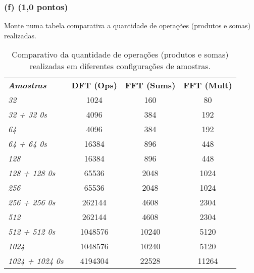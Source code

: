 \subsubsection*{(f) \textbf{(1,0 pontos)}}
Monte numa tabela comparativa a quantidade de operações (produtos e somas) realizadas.

\begin{table}[ht]
    \centering
    \begin{tabular}{lccc}
    \textit{\textbf{Amostras}}            & \textbf{DFT (Ops)} & \textbf{FFT (Sums)} & \textbf{FFT (Mult)} \\
    \textit{32}                       & 1024                                & 160                  & 80                            \\
    \textit{32 + 32 0s}     & 4096                                & 384                  & 192                           \\
    \textit{64}                       & 4096                                & 384                  & 192                           \\
    \textit{64 + 64 0s}     & 16384                               & 896                  & 448                           \\
    \textit{128}                      & 16384                               & 896                  & 448                           \\
    \textit{128 + 128 0s}   & 65536                               & 2048                 & 1024                          \\
    \textit{256}                      & 65536                               & 2048                 & 1024                          \\
    \textit{256 + 256 0s}   & 262144                              & 4608                 & 2304                          \\
    \textit{512}                      & 262144                              & 4608                 & 2304                          \\
    \textit{512 + 512 0s}   & 1048576                             & 10240                & 5120                          \\
    \textit{1024}                     & 1048576                             & 10240                & 5120                          \\
    \textit{1024 + 1024 0s} & 4194304                             & 22528                & 11264                        
    \end{tabular}
    \caption{Comparativo da quantidade de operações (produtos e somas) realizadas em diferentes configurações de amostras.}
    \label{tab:operacoes_comparativo}
\end{table}
